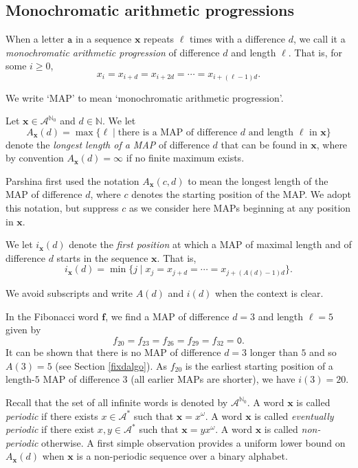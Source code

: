 \documentclass[10pt,a4paper,reqno]{amsart}
\newcommand{\N}{{\mathbb N}}
\newcommand{\bff}{{\mathbf f}}
\newcommand{\bfx}{{\mathbf x}}
\newcommand{\mc}{\mathcal}
\newcommand{\A}{\mc A}
\begin{document}
\subsection{Monochromatic arithmetic progressions}\label{SEC:maps}
\begin{definition}
When a letter $\mathtt{a}$ in a sequence $\bfx$ repeats $\ell$ times with a difference $d$, we call it a {\em monochromatic arithmetic progression} of difference $d$ and length $\ell$. That is, for some $i \geq 0$,
\[
x_{i} = x_{i+d} = x_{i+2d} = \cdots = x_{i+(\ell-1)d}.
\]
\end{definition}
We write `MAP' to mean `monochromatic arithmetic progression'.
\begin{definition}
Let $\bfx\in \A^{\N_0}$ and $d\in\N$. We let
\[
A_\bfx(d) = \max\{\ell \mid \text{there is a MAP of difference $d$ and length $\ell$ in $\bfx$}\}
\]
denote the {\em longest length of a MAP} of difference $d$ that can be found in $\bfx$, where by convention $A_\bfx(d) = \infty$ if no finite maximum exists.
\end{definition}
\begin{rem}
    Parshina \cite{parshina15} first used the notation $A_\bfx(c,d)$ to mean the longest length of the MAP of difference $d$, where $c$ denotes the starting position of the MAP. We adopt this notation, but suppress $c$ as we consider here MAPs beginning at any position in $\bfx$.
\end{rem}
\begin{definition}
We let $i_\bfx(d)$ denote the {\em first position} at which a MAP of maximal length and of difference $d$ starts in the sequence $\bfx$. That is, \[i_\bfx(d) = \min\{j \mid x_j=x_{j+d}=\cdots = x_{j+(A(d)-1)d}\}.\]
\end{definition}
We avoid subscripts and write $A(d)$ and $i(d)$ when the context is clear.
\begin{example}\label{ex1}
In the Fibonacci word $\bff$, we find a MAP of difference $d=3$ and length $\ell=5$ given by
\[
f_{20}=f_{23}=f_{26}=f_{29}=f_{32}=\mathtt{0}.
\]
It can be shown that there is no MAP of difference $d=3$ longer than $5$ and so $A(3) = 5$ (see Section \ref{fixdalgo}).
As $f_{20}$ is the earliest starting position of a length-$5$ MAP of difference $3$ (all earlier MAPs are shorter), we have $i(3) = 20$.
\end{example}
Recall that the set of all infinite words is denoted by $\mc{A}^{\mathbb{N}_0}$. A word $\bfx$ is called {\em periodic} if there exists $x \in \mc{A}^*$ such that $\bfx=x^\omega$. A word $\bfx$ is called {\em eventually periodic} if there exist $x,y \in \mc{A}^*$ such that $\bfx=yx^\omega$. A word $\bfx$ is called {\em non-periodic} otherwise. A first simple observation provides a uniform lower bound on $A_\bfx(d)$ when $\bfx$ is a non-periodic sequence over a binary alphabet.
\end{document}
